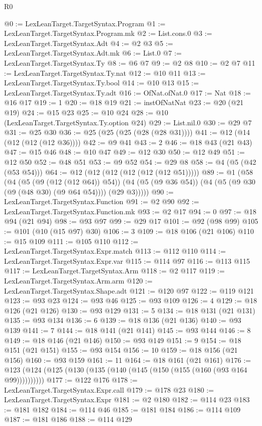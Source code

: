 \begin{lexlean}{R0}
\begin{coremodule}
@0 := LexLeanTarget.TargetSyntax.Program
@1 := LexLeanTarget.TargetSyntax.Program.mk
@2 := List.cons.{0}
@3 := LexLeanTarget.TargetSyntax.Adt
@4 := @2 @3
@5 := LexLeanTarget.TargetSyntax.Adt.mk
@6 := List.{0}
@7 := LexLeanTarget.TargetSyntax.Ty
@8 := @6 @7
@9 := @2 @8
@10 := @2 @7
@11 := LexLeanTarget.TargetSyntax.Ty.nat
@12 := @10 @11
@13 := LexLeanTarget.TargetSyntax.Ty.bool
@14 := @10 @13
@15 := LexLeanTarget.TargetSyntax.Ty.adt
@16 := OfNat.ofNat.{0}
@17 := Nat
@18 := @16 @17
@19 := 1
@20 := @18 @19
@21 := instOfNatNat
@23 := @20 (@21 @19)
@24 := @15 @23
@25 := @10 @24
@28 := @10 (LexLeanTarget.TargetSyntax.Ty.option @24)
@29 := List.nil.{0}
@30 := @29 @7
@31 := @25 @30
@36 := @25 (@25 (@25 (@28 (@28 @31))))
@41 := @12 (@14 (@12 (@12 (@12 @36))))
@42 := @9 @41
@43 := 2
@46 := @18 @43 (@21 @43)
@47 := @15 @46
@48 := @10 @47
@49 := @12 @30
@50 := @12 @49
@51 := @12 @50
@52 := @48 @51
@53 := @9 @52
@54 := @29 @8
@58 := @4 (@5 (@42 (@53 @54)))
@64 := @12 (@12 (@12 (@12 (@12 (@12 @51)))))
@89 := @1
    (@58
      (@4
        (@5 (@9 (@12 (@12 @64)) @54))
        (@4 (@5 (@9 @36 @54)) (@4 (@5 (@9 @30 (@9 (@48 @30) (@9 @64 @54)))) (@29 @3)))))
@90 := LexLeanTarget.TargetSyntax.Function
@91 := @2 @90
@92 := LexLeanTarget.TargetSyntax.Function.mk
@93 := @2 @17
@94 := 0
@97 := @18 @94 (@21 @94)
@98 := @93 @97
@99 := @29 @17
@101 := @92 (@98 @99)
@105 := @101 (@10 (@15 @97) @30)
@106 := 3
@109 := @18 @106 (@21 @106)
@110 := @15 @109
@111 := @105 @110
@112 := LexLeanTarget.TargetSyntax.Expr.match
@113 := @112 @110
@114 := LexLeanTarget.TargetSyntax.Expr.var
@115 := @114 @97
@116 := @113 @115
@117 := LexLeanTarget.TargetSyntax.Arm
@118 := @2 @117
@119 := LexLeanTarget.TargetSyntax.Arm.arm
@120 := LexLeanTarget.TargetSyntax.Shape.adt
@121 := @120 @97
@122 := @119 @121
@123 := @93 @23
@124 := @93 @46
@125 := @93 @109
@126 := 4
@129 := @18 @126 (@21 @126)
@130 := @93 @129
@131 := 5
@134 := @18 @131 (@21 @131)
@135 := @93 @134
@136 := 6
@139 := @18 @136 (@21 @136)
@140 := @93 @139
@141 := 7
@144 := @18 @141 (@21 @141)
@145 := @93 @144
@146 := 8
@149 := @18 @146 (@21 @146)
@150 := @93 @149
@151 := 9
@154 := @18 @151 (@21 @151)
@155 := @93 @154
@156 := 10
@159 := @18 @156 (@21 @156)
@160 := @93 @159
@161 := 11
@164 := @18 @161 (@21 @161)
@176 := @123 (@124 (@125 (@130 (@135 (@140 (@145 (@150 (@155 (@160 (@93 @164 @99))))))))))
@177 := @122 @176
@178 := LexLeanTarget.TargetSyntax.Expr.call
@179 := @178 @23
@180 := LexLeanTarget.TargetSyntax.Expr
@181 := @2 @180
@182 := @114 @23
@183 := @181 @182
@184 := @114 @46
@185 := @181 @184
@186 := @114 @109
@187 := @181 @186
@188 := @114 @129

\end{coremodule}
\end{lexlean}
